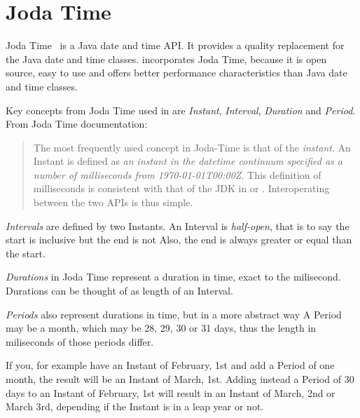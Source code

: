 \section{Joda Time}
Joda Time~\cite{jodatime} is a Java date and time API.
It provides a quality replacement for the Java date and time classes.
\salespoint incorporates Joda Time, because it is open source, easy to use and offers better performance characteristics than Java date and time classes.

Key concepts from Joda Time used in \salespoint{} are \textit{Instant}, \textit{Interval}, \textit{Duration} and \textit{Period}.
From Joda Time documentation:
\begin{quote}
The most frequently used concept in Joda-Time is that of the \textit{instant}.
An Instant is defined as \textit{an instant in the datetime continuum specified as a number of milliseconds from 1970-01-01T00:00Z}.
This definition of milliseconds is consistent with that of the JDK in  or .
Interoperating between the two APIs is thus simple.
\end{quote}

\textit{Intervals} are defined by two Instants.
An Interval is \textit{half-open}, that is to say the start is inclusive but the end is not
Also, the end is always greater or equal than the start.

\textit{Durations} in Joda Time represent a duration in time, exact to the milisecond.
Durations can be thought of as length of an Interval.

\textit{Periods} also represent durations in time, but in a more abstract way
A Period may be a month, which may be 28, 29, 30 or 31 days, thus the length in miliseconds of those periods differ.

If you, for example have an Instant of February, 1st and add a Period of one month, the result will be an Instant of March, 1st.
Adding instead a Period of 30 days to an Instant of February, 1st will result in an Instant of March, 2nd or March 3rd, depending if the Instant is in a leap year or not.

